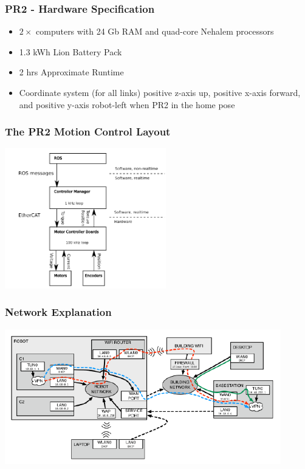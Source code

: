 \begin{frame}
  \frametitle{PR2 - Hardware Specification}
\begin{itemize}
    \item $2\times$ computers with 24 Gb RAM and quad-core Nehalem processors
    \item 1.3 kWh Lion Battery Pack
    \item 2 hrs Approximate Runtime
    \item Coordinate system (for all links) positive z-axis up, positive x-axis forward, and positive y-axis robot-left when PR2 in the home pose
    
\end{itemize}
\end{frame}


\begin{frame}
  \frametitle{The PR2 Motion Control Layout}
\hspace{15ex}\includegraphics[width=7cm]{images/motion_control.png} 
\end{frame}

\begin{frame}
  \frametitle{Network Explanation}
\includegraphics[width=12cm]{images/network.png} 
\end{frame}


